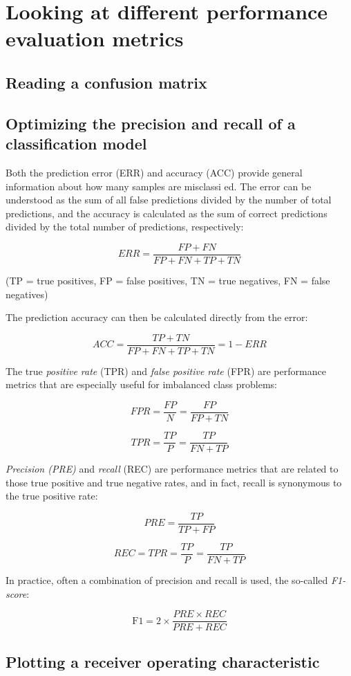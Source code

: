 \documentclass[letterpaper]{report}
\begin{document}
\section{Looking at different performance evaluation metrics}
\subsection{Reading a confusion matrix}
\subsection{Optimizing the precision and recall of a classification model}

Both the prediction error (ERR) and accuracy (ACC) provide general information about how many samples are misclassi ed. The error can be understood as the sum of all false predictions divided by the number of total predictions, and the accuracy is calculated as the sum of correct predictions divided by the total number of predictions, respectively:

\[
ERR = \frac{FP + FN}{FP + FN + TP + TN}
\]

(TP = true positives, FP = false positives, TN = true negatives, FN = false negatives)

The prediction accuracy can then be calculated directly from the error:

\[
ACC = \frac{TP + TN}{FP + FN + TP + TN} = 1 - ERR
\]

The true \textit{positive rate} (TPR) and \textit{false positive rate} (FPR) are performance metrics that are especially useful for imbalanced class problems:

\[
FPR = \frac{FP}{N} = \frac{FP}{FP + TN}
\]

\[
TPR = \frac{TP}{P} = \frac{TP}{FN+TP}
\]

\textit{Precision (PRE)} and \textit{recall} (REC) are performance metrics that are related to those true positive and true negative rates, and in fact, recall is synonymous to the true positive rate:

\[
PRE = \frac{TP}{TP + FP}
\]

\[
REC = TPR = \frac{TP}{P} = \frac{TP}{FN + TP}
\]

In practice, often a combination of precision and recall is used, the so-called \textit{F1-score}:

\[
\text{F1} = 2 \times \frac{PRE \times REC}{PRE + REC}
\]

\subsection{Plotting a receiver operating characteristic}
\end{document}
